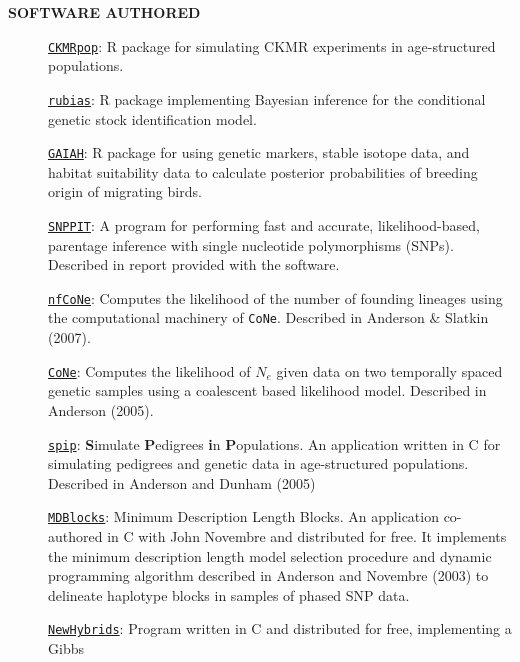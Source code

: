 \documentclass[11pt]{article}
\begin{document}
{\bf SOFTWARE AUTHORED}
\begin{description}
\item[]\href{https://CRAN.R-project.org/package=CKMRpop}{\texttt{CKMRpop}}: R package for simulating CKMR experiments in age-structured populations.
\item[]\href{https://CRAN.R-project.org/package=rubias}{\texttt{rubias}}: R package implementing Bayesian inference for the conditional genetic stock identification model.
\item[]\href{https://CRAN.R-project.org/package=gaiah}{\texttt{GAIAH}}: R package for using genetic markers, stable isotope data, and habitat suitability data to calculate posterior probabilities of breeding origin of migrating birds.
\item[]\href{http://swfsc.noaa.gov//staff.aspx?Division=FED&id=740}{\texttt{SNPPIT}}:  
A program for performing fast and accurate, likelihood-based, parentage inference with single nucleotide polymorphisms (SNPs).  Described in report provided with the software.
\item[]\href{http://users.soe.ucsc.edu/~eriq/dokuwiki/doku.php?id=software:nfcone:nfcone_main}{{\tt nfCoNe}}: Computes the likelihood of the number of founding lineages using the computational machinery of {\tt CoNe}.  Described in Anderson \& Slatkin (2007).
\item[]\href{http://swfsc.noaa.gov//staff.aspx?Division=FED&id=740}{\texttt{CoNe}}:  Computes the likelihood of $N_e$ given data on two temporally spaced genetic samples using a coalescent based likelihood model. Described in Anderson (2005).
\item[]\href{http://swfsc.noaa.gov//staff.aspx?Division=FED&id=740}{\texttt{spip}}: {\bf S}imulate {\bf P}edigrees {\bf i}n {\bf P}opulations.  An application written in C for simulating pedigrees and genetic data in age-structured populations.  Described in Anderson and Dunham (2005)
\item[]\href{http://ib.berkeley.edu/labs/slatkin/eriq/software/mdb_web/mdblocks.htm}{\texttt{MDBlocks}}: Minimum Description Length Blocks.  An application co-authored in C with John
Novembre and distributed for free.  It implements the minimum description length model selection
procedure and dynamic programming algorithm described in Anderson and Novembre (2003) to delineate
haplotype blocks in samples of phased SNP data.
\item[]\href{http://ib.berkeley.edu/labs/slatkin/eriq/software/software.htm}{\texttt{NewHybrids}}:  Program written in C and distributed for free, implementing a Gibbs

\end{description}
\end{document}
